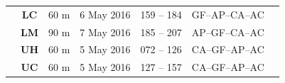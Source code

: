 \documentclass[12pt]{article}
\begin{document}
\begin{landscape}
\begin{table}[]
\begin{tabular}{ccccccl}
                                                                             & \textbf{LC}                                                  & 60 m                                                                     & 6 May 2016    & 159 -- 184                                                                 & GF--AP--CA--AC                                                     &                                                                                                                                                                                                                                                  \\
                                                                             & \textbf{LM}                                                  & 90 m                                                                     & 7 May 2016    & 185 -- 207                                                                 & AP--GF--CA--AC                                                     &                                                                                                                                                                                                                                                  \\
                                                                             & \textbf{UH}                                                  & 60 m                                                                     & 5 May 2016    & 072 -- 126                                                                 & CA--GF--AP--AC                                                     &                                                                                                                                                                                                                                                  \\
                                                                             & \textbf{UC}                                                  & 60 m                                                                     & 5 May 2016    & 127 -- 157                                                                 & CA--GF--AP--AC                                                     &                                                                                                                                                                                                                                                  \\

\end{tabular}
\end{table}
\end{landscape}
\end{document}

